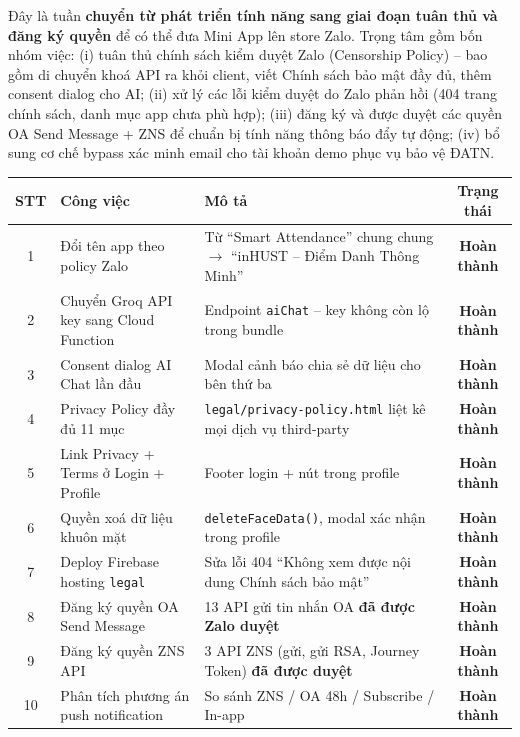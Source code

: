 \documentclass{article}
\begin{document}
Đây là tuần \textbf{chuyển từ phát triển tính năng sang giai đoạn tuân thủ và đăng ký quyền} để có thể đưa Mini App lên store Zalo. Trọng tâm gồm bốn nhóm việc: (i) tuân thủ chính sách kiểm duyệt Zalo (Censorship Policy) -- bao gồm di chuyển khoá API ra khỏi client, viết Chính sách bảo mật đầy đủ, thêm consent dialog cho AI; (ii) xử lý các lỗi kiểm duyệt do Zalo phản hồi (404 trang chính sách, danh mục app chưa phù hợp); (iii) đăng ký và được duyệt các quyền OA Send Message + ZNS để chuẩn bị tính năng thông báo đẩy tự động; (iv) bổ sung cơ chế bypass xác minh email cho tài khoản demo phục vụ bảo vệ ĐATN.

\begin{center}
\begin{tabularx}{\textwidth}{@{}c l X c@{}}
\toprule
\textbf{STT} & \textbf{Công việc} & \textbf{Mô tả} & \textbf{Trạng thái} \\
\midrule
1 & Đổi tên app theo policy Zalo & Từ ``Smart Attendance'' chung chung $\to$ ``inHUST -- Điểm Danh Thông Minh'' & \textcolor{statusgreen}{\textbf{Hoàn thành}} \\
2 & Chuyển Groq API key sang Cloud Function & Endpoint \texttt{aiChat} -- key không còn lộ trong bundle & \textcolor{statusgreen}{\textbf{Hoàn thành}} \\
3 & Consent dialog AI Chat lần đầu & Modal cảnh báo chia sẻ dữ liệu cho bên thứ ba & \textcolor{statusgreen}{\textbf{Hoàn thành}} \\
4 & Privacy Policy đầy đủ 11 mục & \texttt{legal/privacy-policy.html} liệt kê mọi dịch vụ third-party & \textcolor{statusgreen}{\textbf{Hoàn thành}} \\
5 & Link Privacy + Terms ở Login + Profile & Footer login + nút trong profile & \textcolor{statusgreen}{\textbf{Hoàn thành}} \\
6 & Quyền xoá dữ liệu khuôn mặt & \texttt{deleteFaceData()}, modal xác nhận trong profile & \textcolor{statusgreen}{\textbf{Hoàn thành}} \\
7 & Deploy Firebase hosting \texttt{legal} & Sửa lỗi 404 ``Không xem được nội dung Chính sách bảo mật'' & \textcolor{statusgreen}{\textbf{Hoàn thành}} \\
8 & Đăng ký quyền OA Send Message & 13 API gửi tin nhắn OA \textbf{đã được Zalo duyệt} & \textcolor{statusgreen}{\textbf{Hoàn thành}} \\
9 & Đăng ký quyền ZNS API & 3 API ZNS (gửi, gửi RSA, Journey Token) \textbf{đã được duyệt} & \textcolor{statusgreen}{\textbf{Hoàn thành}} \\
10 & Phân tích phương án push notification & So sánh ZNS / OA 48h / Subscribe / In-app & \textcolor{statusgreen}{\textbf{Hoàn thành}} \\

\end{tabularx}
\end{center}
\end{document}
